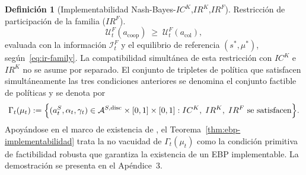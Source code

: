 \documentclass[review,authoryear,12pt]{elsarticle}
\theoremstyle{plain}
\theoremstyle{definition}
\newtheorem{definition}[theorem]{Definición}
\newcommand{\1}{\mathbf{1}}
\begin{document}
\begin{definition}[Implementabilidad Nash-Bayes-$IC^K$,$IR^K$,$IR^F$]
\smallskip
\noindent Restricción de participación de la familia \textup{(}$IR^F$\textup{)}.
\[
\mathcal{U}^F_t(a_{\mathrm{coop}})\;\ge\;\mathcal{U}^F_t(a_{\mathrm{col}}),
\]
evaluada con la información $\mathcal{I}_t^F$ y el equilibrio de referencia $(s^\ast,\mu^\ast)$, según~\eqref{eq:ir-family}.
La compatibilidad simultánea de esta restricción con $IC^K$ e $IR^K$ no se asume por separado. El conjunto de tripletes de política que satisfacen simultáneamente las tres condiciones anteriores se denomina el conjunto factible de políticas y se denota por
\begin{equation}
\label{eq:gamma-factible}
\Gamma_t(\mu_t)
:=\Bigl\{(a_t^S,\alpha_t,\gamma_t)\in
\mathcal{A}^{S,\mathrm{disc}}\times[0,1]\times[0,1] :
IC^K,\;IR^K,\;IR^F
\text{ se satisfacen}\Bigr\}.
\end{equation}
Apoyándose en el marco de existencia de \citet{KadanRenySwinkels2017}, el Teorema~\ref{thm:ebp-implementabilidad} trata la no vacuidad de $\Gamma_t(\mu_t)$ como la condición primitiva de factibilidad robusta que garantiza la existencia de un EBP implementable. La demostración se presenta en el Apéndice~3.
\end{definition}
\end{document}
